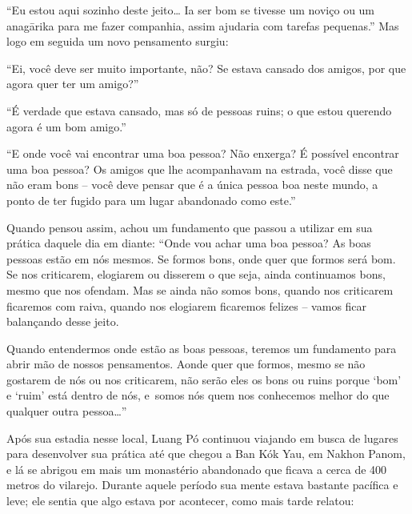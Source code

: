``Eu estou aqui sozinho deste jeito\ldots{} Ia ser bom se tivesse um
noviço ou um anagārika para me fazer companhia, assim ajudaria com
tarefas pequenas.'' Mas logo em seguida um novo pensamento surgiu:

``Ei, você deve ser muito importante, não? Se estava cansado dos amigos,
por que agora quer ter um amigo?''

``É verdade que estava cansado, mas só de pessoas ruins; o que estou
querendo agora é um bom amigo.''

``E onde você vai encontrar uma boa pessoa? Não enxerga? É possível
encontrar uma boa pessoa? Os amigos que lhe acompanhavam na estrada,
você disse que não eram bons -- você deve pensar que é a única pessoa
boa neste mundo, a ponto de ter fugido para um lugar abandonado como
este.''

Quando pensou assim, achou um fundamento que passou a utilizar em sua
prática daquele dia em diante: ``Onde vou achar uma boa pessoa? As boas
pessoas estão em nós mesmos. Se formos bons, onde quer que formos será
bom. Se nos criticarem, elogiarem ou disserem o que seja, ainda
continuamos bons, mesmo que nos ofendam. Mas se ainda não somos bons,
quando nos criticarem ficaremos com raiva, quando nos elogiarem
ficaremos felizes -- vamos ficar balançando desse jeito.

Quando entendermos onde estão as boas pessoas, teremos um fundamento
para abrir mão de nossos pensamentos. Aonde quer que formos, mesmo se
não gostarem de nós ou nos criticarem, não serão eles os bons ou ruins
porque `bom' e `ruim' está dentro de nós, e~somos nós quem nos
conhecemos melhor do que qualquer outra pessoa\ldots{}''

Após sua estadia nesse local, Luang Pó continuou viajando em busca de
lugares para desenvolver sua prática até que chegou a Ban Kók Yau, em
Nakhon Panom, e lá se abrigou em mais um monastério abandonado que
ficava a cerca de 400 metros do vilarejo. Durante aquele período sua
mente estava bastante pacífica e leve; ele sentia que algo estava por
acontecer, como mais tarde relatou:

